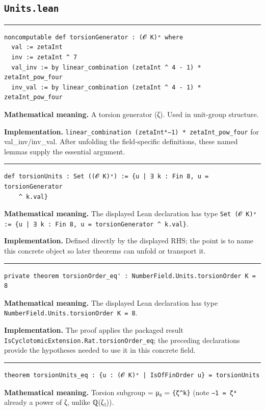 \documentclass[UTF8,a4paper,11pt,fontset=fandol]{ctexart}
\theoremstyle{definition}
\newcommand{\statementsep}{\par\medskip\hrule\medskip}
\begin{document}
\subsection{\texttt{Units.lean}}

\statementsep
\begin{verbatim}
noncomputable def torsionGenerator : (𝓞 K)ˣ where
  val := zetaInt
  inv := zetaInt ^ 7
  val_inv := by linear_combination (zetaInt ^ 4 - 1) * zetaInt_pow_four
  inv_val := by linear_combination (zetaInt ^ 4 - 1) * zetaInt_pow_four
\end{verbatim}
\noindent\textbf{Mathematical meaning.} A torsion generator (ζ). Used in unit-group structure.\par
\noindent\textbf{Implementation.} \texttt{linear\_\allowbreak{}combination (zetaInt⁴−1) * zetaInt\_\allowbreak{}pow\_\allowbreak{}four} for val\_\allowbreak{}inv/inv\_\allowbreak{}val. After unfolding the field-specific definitions, these named lemmas supply the essential argument.\par
\statementsep
\begin{verbatim}
def torsionUnits : Set ((𝓞 K)ˣ) := {u | ∃ k : Fin 8, u = torsionGenerator
    ^ k.val}
\end{verbatim}
\noindent\textbf{Mathematical meaning.} The displayed Lean declaration has type \texttt{Set (𝓞 K)ˣ := \{u | ∃ k : Fin 8, u = torsionGenerator \textasciicircum{} k.\allowbreak{}val\}}.\par
\noindent\textbf{Implementation.} Defined directly by the displayed RHS; the point is to name this concrete object so later theorems can unfold or transport it.\par
\statementsep
\begin{verbatim}
private theorem torsionOrder_eq' : NumberField.Units.torsionOrder K = 8
\end{verbatim}
\noindent\textbf{Mathematical meaning.} The displayed Lean declaration has type \texttt{NumberField.\allowbreak{}Units.\allowbreak{}torsionOrder K = 8}.\par
\noindent\textbf{Implementation.} The proof applies the packaged result \texttt{IsCyclotomicExtension.\allowbreak{}Rat.\allowbreak{}torsionOrder\_\allowbreak{}eq}; the preceding declarations provide the hypotheses needed to use it in this concrete field.\par
\statementsep
\begin{verbatim}
theorem torsionUnits_eq : {u : (𝓞 K)ˣ | IsOfFinOrder u} = torsionUnits
\end{verbatim}
\noindent\textbf{Mathematical meaning.} Torsion subgroup = μ₈ = \texttt{\{ζ\textasciicircum{}k\}} (note \texttt{−1 = ζ⁴} already a power of ζ, unlike ℚ(ζ₅)).\par
\end{document}
